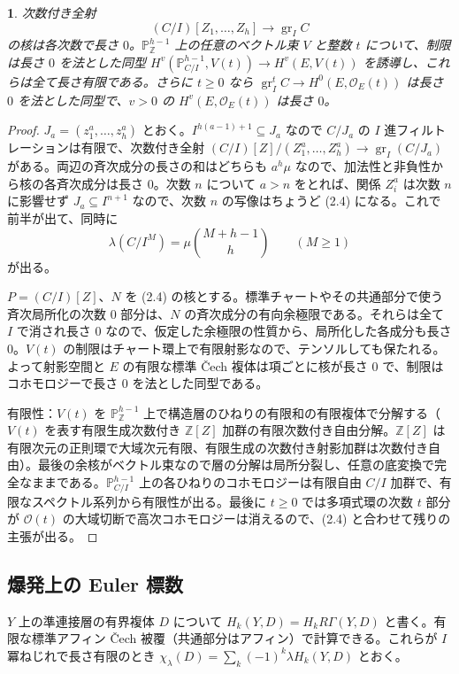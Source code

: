 \documentclass[11pt,a4paper]{ltjsarticle}
\newcommand{\stmtname}{}
\theoremstyle{plain}
\newtheorem*{stmtgen}{\stmtname}
\newenvironment{stmt}[1]{\renewcommand{\stmtname}{#1}\begin{stmtgen}}{\end{stmtgen}}
\theoremstyle{definition}
\newcommand{\gr}{\operatorname{gr}}
\newcommand{\Z}{\mathbb{Z}}
\newcommand{\PP}{\mathbb{P}}
\newcommand{\cO}{\mathcal{O}}
\begin{document}
\begin{stmt}{補題 2.3}
次数付き全射
\begin{equation}\tag{2.4}
  (C/I)[Z_1,\dots,Z_h]\longrightarrow\gr_IC
\end{equation}
の核は各次数で長さ $0$。$\PP^{h-1}_\Z$ 上の任意のベクトル束 $V$ と整数 $t$ について、制限は長さ $0$ を法とした同型
$H^v(\PP^{h-1}_{C/I},V(t))\to H^v(E,V(t))$ を誘導し、これらは全て長さ有限である。さらに $t\ge0$ なら $\gr_I^tC\to H^0(E,\cO_E(t))$ は長さ $0$ を法とした同型で、$v>0$ の $H^v(E,\cO_E(t))$ は長さ $0$。
\end{stmt}
\begin{proof}
$J_a = (z_1^a,\dots,z_h^a)$ とおく。$I^{h(a-1)+1}\subseteq J_a$ なので $C/J_a$ の $I$ 進フィルトレーションは有限で、次数付き全射
$(C/I)[Z]/(Z_1^a,\dots,Z_h^a)\to\gr_I(C/J_a)$
がある。両辺の斉次成分の長さの和はどちらも $a^h\mu$ なので、加法性と非負性から核の各斉次成分は長さ $0$。次数 $n$ について $a>n$ をとれば、関係 $Z_i^a$ は次数 $n$ に影響せず $J_a\subseteq I^{n+1}$ なので、次数 $n$ の写像はちょうど (2.4) になる。これで前半が出て、同時に
\begin{equation}\tag{2.5}
  \lambda(C/I^M) = \mu\binom{M+h-1}{h}\qquad(M\ge1)
\end{equation}
が出る。

$P = (C/I)[Z]$、$N$ を (2.4) の核とする。標準チャートやその共通部分で使う斉次局所化の次数 $0$ 部分は、$N$ の斉次成分の有向余極限である。それらは全て $I$ で消され長さ $0$ なので、仮定した余極限の性質から、局所化した各成分も長さ $0$。$V(t)$ の制限はチャート環上で有限射影なので、テンソルしても保たれる。よって射影空間と $E$ の有限な標準 Čech 複体は項ごとに核が長さ $0$ で、制限はコホモロジーで長さ $0$ を法とした同型である。

有限性：$V(t)$ を $\PP^{h-1}_\Z$ 上で構造層のひねりの有限和の有限複体で分解する（$V(t)$ を表す有限生成次数付き $\Z[Z]$ 加群の有限次数付き自由分解。$\Z[Z]$ は有限次元の正則環で大域次元有限、有限生成の次数付き射影加群は次数付き自由）。最後の余核がベクトル束なので層の分解は局所分裂し、任意の底変換で完全なままである。$\PP^{h-1}_{C/I}$ 上の各ひねりのコホモロジーは有限自由 $C/I$ 加群で、有限なスペクトル系列から有限性が出る。最後に $t\ge0$ では多項式環の次数 $t$ 部分が $\cO(t)$ の大域切断で高次コホモロジーは消えるので、(2.4) と合わせて残りの主張が出る。
\end{proof}

\subsection{爆発上の Euler 標数}
$Y$ 上の準連接層の有界複体 $D$ について $H_k(Y,D) = H_kR\Gamma(Y,D)$ と書く。有限な標準アフィン Čech 被覆（共通部分はアフィン）で計算できる。これらが $I$ 冪ねじれで長さ有限のとき
$\chi_\lambda(D) = \sum_k(-1)^k\lambda H_k(Y,D)$
とおく。
\end{document}
